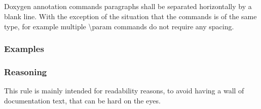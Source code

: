 \subsection*{\doxygenRule{}}

Doxygen annotation commands paragraphs shall be separated horizontally by a blank line. With the exception of the situation that the commands is of the same type, for example multiple \textbackslash param commands do not require any spacing.

\subsubsection*{Examples}

\noindent
\begin{minipage}[t]{\codelstwidth\textwidth}
    
\end{minipage}\hfill
\begin{minipage}[t]{\codelstwidth\textwidth}
    
\end{minipage}

\subsubsection*{Reasoning}

This rule is mainly intended for readability reasons, to avoid having a wall of documentation text, that can be hard on the eyes.
